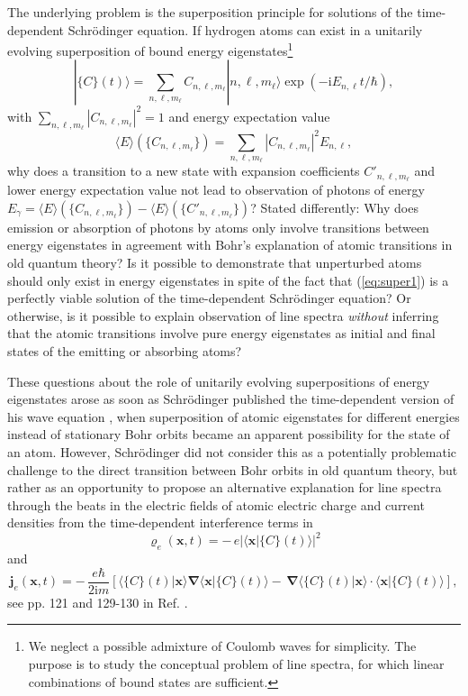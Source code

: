 \documentclass[final,3p,12pt]{elsarticle3}
\begin{document}
The underlying problem is the superposition principle for solutions of the 
time-dependent Schr\"odinger equation. If hydrogen atoms can exist in a 
unitarily evolving superposition of bound energy 
eigenstates\footnote{We neglect a possible admixture of Coulomb waves for
simplicity. The purpose is to study the conceptual problem of line
spectra, for which linear combinations of bound states are sufficient.}
\begin{equation}\label{eq:super1}
|\{C\}(t)\rangle=\sum_{n,\ell,m_\ell}C_{n,\ell,m_\ell}|n,\ell,m_\ell\rangle
\exp(-\mathrm{i}E_{n,\ell}t/\hbar),
\end{equation}
with $\sum_{n,\ell,m_\ell}|C_{n,\ell,m_\ell}|^2=1$ and energy expectation value
\[
\langle E\rangle(\{C_{n,\ell,m_\ell}\})
=\sum_{n,\ell,m_\ell}|C_{n,\ell,m_\ell}|^2E_{n,\ell},
\]
why does a transition to a new state with expansion coefficients $C'_{n,\ell,m_\ell}$
and lower energy expectation value not lead to observation of photons of energy
$E_\gamma=\langle E\rangle(\{C_{n,\ell,m_\ell}\})-\langle E\rangle(\{C'_{n,\ell,m_\ell}\})$?
Stated differently: Why does emission or absorption of photons by atoms only 
involve transitions between energy eigenstates in agreement with Bohr's explanation
of atomic transitions in old quantum theory? 
Is it possible to demonstrate that unperturbed atoms should only exist in energy
eigenstates in spite of the fact that (\ref{eq:super1}) is a perfectly viable
solution of the time-dependent Schr\"odinger equation?
Or otherwise, is it possible to explain 
observation of line spectra \textit{without} inferring that the atomic transitions 
involve pure energy eigenstates as initial and final states of the emitting or 
absorbing atoms?

These questions about the role of unitarily evolving superpositions of energy
eigenstates arose as soon as Schr\"odinger published the time-dependent version of 
his wave equation \cite{erwin}, when superposition of atomic eigenstates for 
different energies instead of stationary Bohr orbits became an apparent possibility for 
the state of an atom. However, Schr\"odinger did not consider this as a potentially 
problematic challenge to the direct transition between Bohr orbits in old quantum 
theory, but rather as an opportunity to propose an alternative explanation for line 
spectra through the beats in the electric fields of atomic electric charge and current 
densities from the time-dependent interference terms in
\[
\varrho_e(\bm{x},t)=-\,e|\langle\bm{x}|\{C\}(t)\rangle|^2
\]
and
\begin{equation}
\bm{j}_e(\bm{x},t)=-\,\frac{e\hbar}{2\mathrm{i}m}[
\langle\{C\}(t)|\bm{x}\rangle\bm{\nabla}\langle\bm{x}|\{C\}(t)\rangle
\label{eq:je}
-\,\bm{\nabla}\langle\{C\}(t)|\bm{x}\rangle\cdot\langle\bm{x}|\{C\}(t)\rangle],
\end{equation}
see pp. 121 and 129-130 in Ref. \cite{erwin}. 
\end{document}
